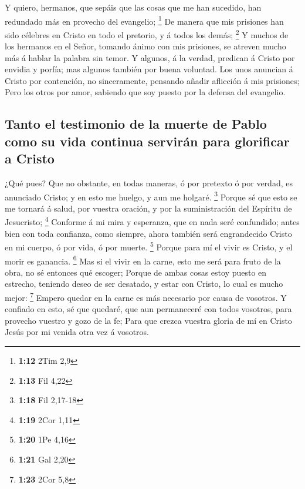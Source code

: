  Y quiero, hermanos, que sepáis que las cosas que me han
sucedido, han redundado más en provecho del evangelio; \footnote{\textbf{1:12}
  2Tim 2,9}  De manera que mis prisiones han sido célebres
en Cristo en todo el pretorio, y á todos los demás; \footnote{\textbf{1:13}
  Fil 4,22}  Y muchos de los hermanos en el Señor, tomando
ánimo con mis prisiones, se atreven mucho más á hablar la palabra sin
temor.  Y algunos, á la verdad, predican á Cristo por
envidia y porfía; mas algunos también por buena voluntad. 
Los unos anuncian á Cristo por contención, no sinceramente, pensando
añadir aflicción á mis prisiones;  Pero los otros por amor,
sabiendo que soy puesto por la defensa del evangelio.

\hypertarget{tanto-el-testimonio-de-la-muerte-de-pablo-como-su-vida-continua-serviruxe1n-para-glorificar-a-cristo}{%
\subsection{Tanto el testimonio de la muerte de Pablo como su vida
continua servirán para glorificar a
Cristo}\label{tanto-el-testimonio-de-la-muerte-de-pablo-como-su-vida-continua-serviruxe1n-para-glorificar-a-cristo}}

 ¿Qué pues? Que no obstante, en todas maneras, ó por
pretexto ó por verdad, es anunciado Cristo; y en esto me huelgo, y aun
me holgaré. \footnote{\textbf{1:18} Fil 2,17-18}  Porque sé
que esto se me tornará á salud, por vuestra oración, y por la
suministración del Espíritu de Jesucristo; \footnote{\textbf{1:19} 2Cor
  1,11}  Conforme á mi mira y esperanza, que en nada seré
confundido; antes bien con toda confianza, como siempre, ahora también
será engrandecido Cristo en mi cuerpo, ó por vida, ó por muerte.
\footnote{\textbf{1:20} 1Pe 4,16}  Porque para mí el vivir
es Cristo, y el morir es ganancia. \footnote{\textbf{1:21} Gal 2,20}
 Mas si el vivir en la carne, esto me será para fruto de la
obra, no sé entonces qué escoger;  Porque de ambas cosas
estoy puesto en estrecho, teniendo deseo de ser desatado, y estar con
Cristo, lo cual es mucho mejor: \footnote{\textbf{1:23} 2Cor 5,8}
 Empero quedar en la carne es más necesario por causa de
vosotros.  Y confiado en esto, sé que quedaré, que aun
permaneceré con todos vosotros, para provecho vuestro y gozo de la fe;
 Para que crezca vuestra gloria de mí en Cristo Jesús por
mi venida otra vez á vosotros.

